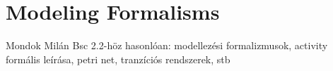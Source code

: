 \section{Modeling Formalisms}


Mondok Milán Bsc 2.2-höz hasonlóan: modellezési formalizmusok, activity formális leírása, petri net, tranzíciós rendszerek, stb